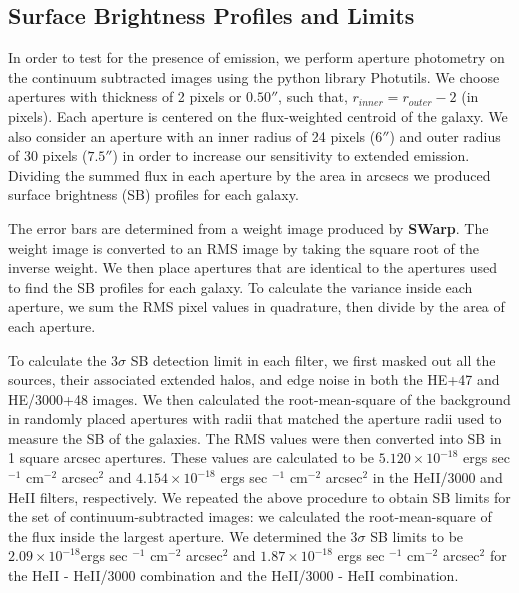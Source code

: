 \documentclass[twocolumn]{aastex6}
\begin{document}
\subsection{Surface Brightness Profiles and Limits}

In order to test for the presence of  emission, we perform aperture photometry on the continuum subtracted images using the python library Photutils. We choose apertures with thickness of 2 pixels or $0.50 ''$, such that, $r_{inner}=r_{outer}-2$ (in pixels). Each aperture is centered on the flux-weighted centroid of the galaxy. We also consider an aperture with an inner radius of 24 pixels ($6''$) and outer radius of 30 pixels ($7.5''$) in order to increase our sensitivity to extended emission. Dividing the summed flux in each aperture by the area in arcsecs we produced surface brightness (SB) profiles for each galaxy. 

The error bars are determined from a weight image produced by \textbf{SWarp}. The weight image is converted to an RMS image by taking the square root of the inverse weight. We then place apertures that are identical to the apertures used to find the SB profiles for each galaxy. To calculate the variance inside each aperture, we sum the RMS pixel values in quadrature, then divide by the area of each aperture. 

To calculate the $3\sigma$ SB detection limit in each filter, we first masked out all the sources, their associated extended halos, and edge noise in both the HE+47 and HE/3000+48 images. We then calculated the root-mean-square of the background in randomly placed apertures with radii that matched the aperture radii used to measure the SB of the galaxies. The RMS values were then converted into SB in 1 square arcsec apertures. These values are calculated to be $5.120\times10^{-18}$ ergs sec $^{-1}$ cm$^{-2}$ arcsec$^2$ and $4.154\times10^{-18} $ ergs sec $^{-1}$ cm$^{-2}$ arcsec$^2$ in the HeII/3000 and HeII filters, respectively. We repeated the above procedure to obtain SB limits for the set of continuum-subtracted images: we calculated the root-mean-square of the flux inside the largest aperture. We determined the 3$\sigma$ SB limits to be $2.09\times10^{-18}$ergs sec $^{-1}$ cm$^{-2}$ arcsec$^2$ and $1.87\times10^{-18}$ ergs sec $^{-1}$ cm$^{-2}$ arcsec$^2$ for the HeII - HeII/3000 combination and the HeII/3000 - HeII combination. 
\end{document}
